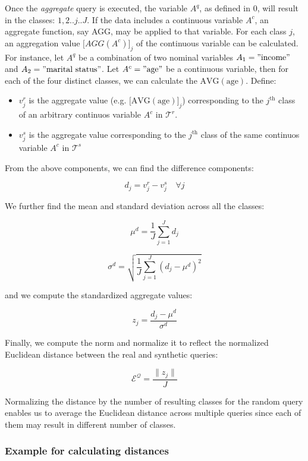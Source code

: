Once the \emph{aggregate} query is executed, the variable \(A^{q}\), as
defined in 0, will result in the classes: \(1,2..j..J\). If the data
includes a continuous variable \(A^{c}\), an aggregate function, say
AGG, may be applied to that variable. For each class \(j\), an
aggregation value \(\lbrack AGG(A^{c})\rbrack_{j}\) of the continuous
variable can be calculated. For instance, let \(A^{q}\) be a combination
of two nominal variables \(A_{1} = \mathrm{"income"}\) and
\(A_{2} = \mathrm{"marital\ status"}\). Let \(A^{c} = \mathrm{"age"}\)
be a continuous variable, then for each of the four distinct classes, we
can calculate the \(\mathrm{\text{AVG}}(\mathrm{\text{age}})\). Define:

\begin{itemize}
\item
  \(v_{j}^{r}\) is the aggregate value (e.g.
  \(\lbrack\mathrm{\text{AVG}}(\mathrm{\text{age}})\rbrack_{j}\))
  corresponding to the \(j^{\text{th}}\) class of an arbitrary continuos
  variable \(A^{c}\) in \(\mathcal{T}^{r}\).
\item
  \(v_{j}^{s}\) is the aggregate value corresponding to the
  \(j^{\text{th}}\) class of the same continuos variable \(A^{c}\) in
  \(\mathcal{T}^{s}\)
\end{itemize}

From the above components, we can find the difference components:

\[d_{j} = v_{j}^{r} - v_{j}^{s}\quad\forall j\]

We further find the mean and standard deviation across all the classes:

\[\mu^{d} = \frac{1}{J}\sum_{j = 1}^{J}d_{j}\]

\[\sigma^{d} = \sqrt{\frac{1}{J}\sum_{j = 1}^{J}(d_{j} - \mu^{d})^{2}}\]

and we compute the standardized aggregate values:

\[z_{j} = \frac{d_{j} - \mu^{d}}{\sigma^{d}}\]

Finally, we compute the norm and normalize it to reflect the normalized
Euclidean distance between the real and synthetic queries:

\[\mathcal{E}^{\mathcal{Q}} = \frac{\parallel z_{j} \parallel}{J}\]

Normalizing the distance by the number of resulting classes for the
random query enables us to average the Euclidean distance across
multiple queries since each of them may result in different number of
classes.

\hypertarget{example-for-calculating-distances}{%
\subsubsection{Example for calculating
distances}\label{example-for-calculating-distances}}


